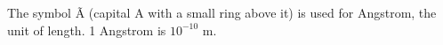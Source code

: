 The symbol Ã (capital A with a small ring above it) is used
for Angstrom, the unit of length. 1 Angstrom is $10^{-10}$  m.